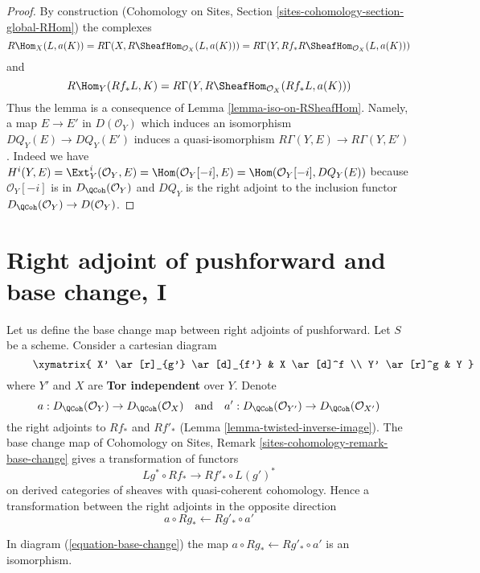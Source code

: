 \begin{proof}
By construction (Cohomology on Sites, Section
\ref{sites-cohomology-section-global-RHom}) the complexes
$$
R\Hom_X(L, a(K)) =
R\Gamma(X, R\SheafHom_{\mathcal{O}_X}(L, a(K))) =
R\Gamma(Y, Rf_*R\SheafHom_{\mathcal{O}_X}(L, a(K)))
$$
and
$$
R\Hom_Y(Rf_*L, K) = R\Gamma(Y, R\SheafHom_{\mathcal{O}_X}(Rf_*L, a(K)))
$$
Thus the lemma is a consequence of Lemma \ref{lemma-iso-on-RSheafHom}.
Namely, a map $E \to E'$ in $D(\mathcal{O}_Y)$ which induces
an isomorphism $DQ_Y(E) \to DQ_Y(E')$ induces a quasi-isomorphism
$R\Gamma(Y, E) \to R\Gamma(Y, E')$. Indeed we have
$H^i(Y, E) = \Ext^i_Y(\mathcal{O}_Y, E) = \Hom(\mathcal{O}_Y[-i], E) =
\Hom(\mathcal{O}_Y[-i], DQ_Y(E))$ because $\mathcal{O}_Y[-i]$
is in $D_\QCoh(\mathcal{O}_Y)$ and $DQ_Y$ is the right adjoint
to the inclusion functor $D_\QCoh(\mathcal{O}_Y) \to D(\mathcal{O}_Y)$.
\end{proof}









\section{Right adjoint of pushforward and base change, I}
\label{section-base-change-map}

\noindent
Let us define the base change map between right adjoints of pushforward.
Let $S$ be a scheme. Consider a cartesian diagram
\begin{equation}
\label{equation-base-change}
\vcenter{
\xymatrix{
X' \ar[r]_{g'} \ar[d]_{f'} & X \ar[d]^f \\
Y' \ar[r]^g & Y
}
}
\end{equation}
where $Y'$ and $X$ are {\bf Tor independent} over $Y$. Denote
$$
a  : D_\QCoh(\mathcal{O}_Y) \to D_\QCoh(\mathcal{O}_X)
\quad\text{and}\quad
a' : D_\QCoh(\mathcal{O}_{Y'}) \to D_\QCoh(\mathcal{O}_{X'})
$$
the right adjoints to $Rf_*$ and $Rf'_*$
(Lemma \ref{lemma-twisted-inverse-image}).
The base change map of
Cohomology on Sites, Remark \ref{sites-cohomology-remark-base-change}
gives a transformation of functors
$$
Lg^* \circ Rf_* \longrightarrow Rf'_* \circ L(g')^*
$$
on derived categories of sheaves with quasi-coherent cohomology.
Hence a transformation between the right adjoints in the opposite direction
$$
a \circ Rg_* \longleftarrow Rg'_* \circ a'
$$

\begin{lemma}
\label{lemma-flat-precompose-pus}
In diagram (\ref{equation-base-change}) the map
$a \circ Rg_* \leftarrow Rg'_* \circ a'$ is an isomorphism.
\end{lemma}

